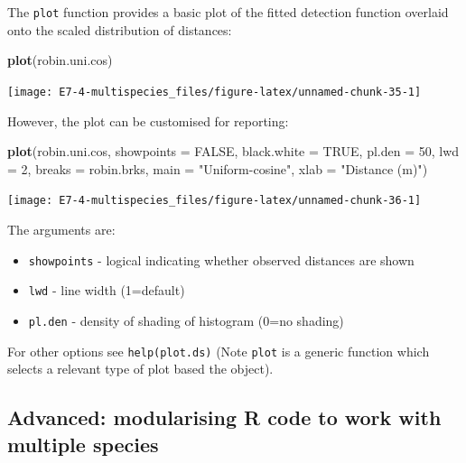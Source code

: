 \documentclass[10pt,a4paper]{tufte-handout}
\newenvironment{Shaded}{\begin{snugshade}}{\end{snugshade}}
\newcommand{\DataTypeTok}[1]{\textcolor[rgb]{0.13,0.29,0.53}{#1}}
\newcommand{\DecValTok}[1]{\textcolor[rgb]{0.00,0.00,0.81}{#1}}
\newcommand{\KeywordTok}[1]{\textcolor[rgb]{0.13,0.29,0.53}{\textbf{#1}}}
\newcommand{\NormalTok}[1]{#1}
\newcommand{\OtherTok}[1]{\textcolor[rgb]{0.56,0.35,0.01}{#1}}
\newcommand{\StringTok}[1]{\textcolor[rgb]{0.31,0.60,0.02}{#1}}
\providecommand{\tightlist}{%
  \setlength{\itemsep}{0pt}\setlength{\parskip}{0pt}}
\begin{document}
The \texttt{plot} function provides a basic plot of the fitted detection
function overlaid onto the scaled distribution of distances:

\begin{Shaded}
\begin{Highlighting}[]
\KeywordTok{plot}\NormalTok{(robin.uni.cos)}
\end{Highlighting}
\end{Shaded}

\begin{marginfigure}
\texttt{[image: E7-4-multispecies\_files/figure-latex/unnamed-chunk-35-1]} \end{marginfigure}

However, the plot can be customised for reporting:

\begin{Shaded}
\begin{Highlighting}[]
\KeywordTok{plot}\NormalTok{(robin.uni.cos, }\DataTypeTok{showpoints =} \OtherTok{FALSE}\NormalTok{, }\DataTypeTok{black.white =} \OtherTok{TRUE}\NormalTok{, }
    \DataTypeTok{pl.den =} \DecValTok{50}\NormalTok{, }\DataTypeTok{lwd =} \DecValTok{2}\NormalTok{, }\DataTypeTok{breaks =}\NormalTok{ robin.brks, }
    \DataTypeTok{main =} \StringTok{"Uniform-cosine"}\NormalTok{, }\DataTypeTok{xlab =} \StringTok{"Distance (m)"}\NormalTok{)}
\end{Highlighting}
\end{Shaded}

\begin{marginfigure}
\texttt{[image: E7-4-multispecies\_files/figure-latex/unnamed-chunk-36-1]} \end{marginfigure}

The arguments are:

\begin{itemize}
\tightlist
\item
  \texttt{showpoints} - logical indicating whether observed distances
  are shown
\item
  \texttt{lwd} - line width (1=default)
\item
  \texttt{pl.den} - density of shading of histogram (0=no shading)
\end{itemize}

For other options see \texttt{help(plot.ds)} (Note \texttt{plot} is a
generic function which selects a relevant type of plot based the
object).

\hypertarget{advanced-modularising-r-code-to-work-with-multiple-species}{%
\subsection{Advanced: modularising R code to work with multiple
species}\label{advanced-modularising-r-code-to-work-with-multiple-species}}
\end{document}
